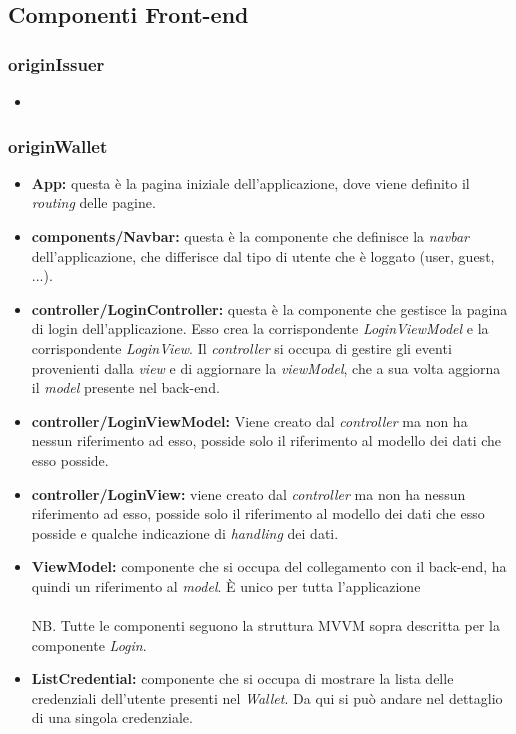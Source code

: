 \subsection{Componenti Front-end}
\subsubsection{originIssuer} 
\begin{itemize}
    \item 
\end{itemize}
\subsubsection{originWallet}
\begin{itemize}
    \item \textbf{App:} questa è la pagina iniziale dell'applicazione, dove viene definito il \textit{routing} delle pagine.
    \item \textbf{components/Navbar:} questa è la componente che definisce la \textit{navbar} dell'applicazione, che differisce dal tipo di utente che è loggato (user, guest, ...).
    \item \textbf{controller/LoginController:} questa è la componente che gestisce la pagina di login dell'applicazione. Esso crea la corrispondente 
    \textit{LoginViewModel} e la corrispondente \textit{LoginView}. Il \textit{controller} si occupa di gestire gli eventi provenienti 
    dalla \textit{view} e di aggiornare la \textit{viewModel}, che a sua volta aggiorna il \textit{model} presente nel back-end.
    \item \textbf{controller/LoginViewModel:} Viene creato dal \textit{controller} ma non ha nessun riferimento ad esso, posside solo il riferimento al modello dei dati che esso posside.
    \item \textbf{controller/LoginView:} viene creato dal \textit{controller} ma non ha nessun riferimento ad esso, posside solo il riferimento al modello dei dati che esso posside e qualche indicazione di \textit{handling} dei dati.
    \item \textbf{ViewModel:} componente che si occupa del collegamento con il back-end, ha quindi un riferimento al \textit{model}. È unico per tutta l'applicazione\\
    \\NB. Tutte le componenti seguono la struttura MVVM sopra descritta per la componente \textit{Login}.
    \item \textbf{ListCredential:} componente che si occupa di mostrare la lista delle credenziali dell'utente presenti nel \textit{Wallet}. Da qui si può andare nel dettaglio di una singola credenziale.

\end{itemize}
